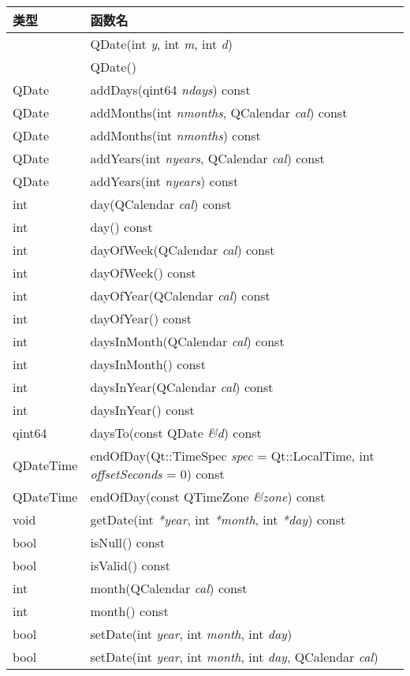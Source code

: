 \begin{longtable}{|l|m{30em}|}
\hline
类型	&函数名\\
\hline
&QDate(int \emph{y}, int \emph{m}, int \emph{d})\\
\hline
&QDate()\\
\hline
QDate&	addDays(qint64 \emph{ndays}) const\\
\hline
QDate&	addMonths(int \emph{nmonths}, QCalendar \emph{cal}) const\\
\hline
QDate&	addMonths(int \emph{nmonths}) const\\
\hline
QDate&	addYears(int \emph{nyears}, QCalendar \emph{cal}) const\\
\hline
QDate&	addYears(int \emph{nyears}) const\\
\hline
int&	day(QCalendar \emph{cal}) const\\
\hline
int&	day() const\\
\hline
int&	dayOfWeek(QCalendar \emph{cal}) const\\
\hline
int&	dayOfWeek() const\\
\hline
int&	dayOfYear(QCalendar \emph{cal}) const\\
\hline
int&	dayOfYear() const\\
\hline
int&	daysInMonth(QCalendar \emph{cal}) const\\
\hline
int&	daysInMonth() const\\
\hline
int&	daysInYear(QCalendar \emph{cal}) const\\
\hline
int&	daysInYear() const\\
\hline
qint64&	daysTo(const QDate \emph{\&d}) const\\
\hline
QDateTime&	endOfDay(Qt::TimeSpec \emph{spec} = Qt::LocalTime, int \emph{offsetSeconds} = 0) const\\
\hline
QDateTime&	endOfDay(const QTimeZone \emph{\&zone}) const\\
\hline
void&	getDate(int \emph{*year}, int \emph{*month}, int \emph{*day}) const\\
\hline
bool&	isNull() const\\
\hline
bool&	isValid() const\\
\hline
int&	month(QCalendar \emph{cal}) const\\
\hline
int&	month() const\\
\hline
bool&	setDate(int \emph{year}, int \emph{month}, int \emph{day})\\
\hline
bool&	setDate(int \emph{year}, int \emph{month}, int \emph{day}, QCalendar \emph{cal})\\

\end{longtable}
